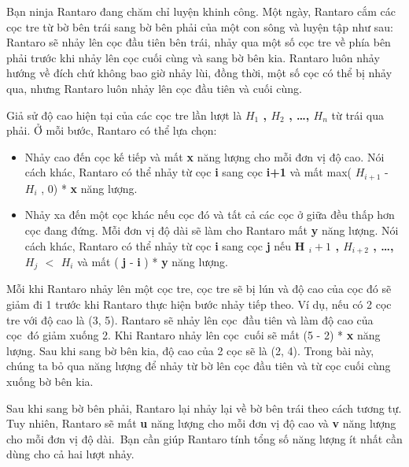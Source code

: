 



   Bạn ninja   Rantaro   đang chăm chỉ luyện khinh công. Một ngày,   Rantaro   cắm các cọc tre từ bờ bên trái sang bờ bên phải của một con sông và luyện tập như sau:   Rantaro   sẽ nhảy lên cọc đầu tiên bên trái, nhảy qua một số cọc tre về phía bên phải trước khi nhảy lên cọc cuối cùng và sang bờ bên kia.   Rantaro   luôn nhảy hướng về đích chứ không bao giờ nhảy lùi, đồng thời, một số cọc có thể bị nhảy qua, nhưng   Rantaro   luôn nhảy lên cọc đầu tiên và cuối cùng.  

   Giả sử độ cao hiện tại của các cọc tre lần lượt là   \textbf{    $H_{1}$    , $H_{2}$    , …, $H_{n}$}   từ trái qua phải. Ở mỗi bước,   Rantaro   có thể lựa chọn:  
\begin{itemize}
	\item     Nhảy cao đến cọc kế tiếp và mất    \textbf{     x    }    năng lượng cho mỗi đơn vị độ cao. Nói cách khác,    Rantaro    có thể nhảy từ cọc    \textbf{     i    }    sang cọc    \textbf{     i+1    }    và mất max(    \textbf{     $H_{i+1}$}    -    \textbf{     $H_{i}$}    , 0) *    \textbf{     x    }    năng lượng.   
	\item     Nhảy xa đến một cọc khác nếu cọc đó và tất cả các cọc ở giữa đều thấp hơn cọc đang đứng. Mỗi đơn vị độ dài sẽ làm cho    Rantaro    mất    \textbf{     y    }    năng lượng. Nói cách khác,    Rantaro    có thể nhảy từ cọc    \textbf{     i    }    sang cọc    \textbf{     j    }    nếu    \textbf{     H     \textbf{$_       i+1      $}     , $H_{i+2}$     , …, $H_{j}$     $<$ $H_{i}$}    và mất (    \textbf{     j    }    -    \textbf{     i    }    ) *    \textbf{     y    }    năng lượng.   
\end{itemize}

   Mỗi khi   Rantaro   nhảy lên một cọc tre, cọc tre sẽ bị lún và độ cao của cọc đó sẽ giảm đi 1 trước khi   Rantaro   thực hiện bước nhảy tiếp theo. Ví dụ, nếu có 2 cọc tre với độ cao là (3, 5).   Rantaro   sẽ nhảy lên cọc đầu tiên và làm độ cao của cọc đó giảm xuống 2. Khi   Rantaro   nhảy lên cọc cuối sẽ mất (5 - 2) *   \textbf{    x   }   năng lượng. Sau khi sang bờ bên kia, độ cao của 2 cọc sẽ là (2, 4). Trong bài này, chúng ta bỏ qua năng lượng để nhảy từ bờ lên cọc đầu tiên và từ cọc cuối cùng xuống bờ bên kia.  

   Sau khi sang bờ bên phải,   Rantaro   lại nhảy lại về bờ bên trái theo cách tương tự. Tuy nhiên,   Rantaro   sẽ mất   \textbf{    u   }   năng lượng cho mỗi đơn vị độ cao và   \textbf{    v   }   năng lượng cho mỗi đơn vị độ dài. Bạn cần giúp Rantaro tính tổng số năng lượng ít nhất cần dùng cho cả hai lượt nhảy.  


